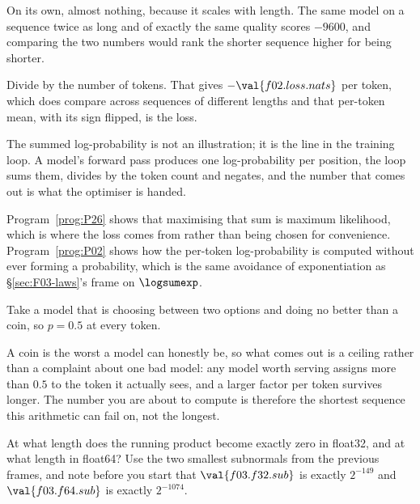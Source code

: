 \begin{fr}
\begin{ansblock}
On its own, almost nothing, because it scales with length. The same model on a
sequence twice as long and of exactly the same quality scores $-9600$, and
comparing the two numbers would rank the shorter sequence higher for being
shorter.

Divide by the number of tokens. That gives $-\val{f02.loss.nats}$ per token,
which does compare across sequences of different lengths \dash{} and that
per-token mean, with its sign flipped, is the loss.
\end{ansblock}

\begin{aibox}
The summed log-probability is not an illustration; it is the line in the
training loop. A model's forward pass produces one log-probability per position,
the loop sums them, divides by the token count and negates, and the number that
comes out is what the optimiser is handed.

Program~\ref{prog:P26} shows that maximising that sum is maximum likelihood,
which is where the loss comes from rather than being chosen for convenience.
Program~\ref{prog:P02} shows how the per-token log-probability is computed
without ever forming a probability, which is the same avoidance of
exponentiation as \S\ref{sec:F03-laws}'s frame on $\logsumexp$.
\end{aibox}
\end{fr}


\begin{fr}
\yourturn
Take a model that is choosing between two options and doing no better than a
coin, so $p = \num{0.5}$ at every token.

A coin is the worst a model can honestly be, so what comes out is a ceiling
rather than a complaint about one bad model: any model worth serving assigns
more than $\num{0.5}$ to the token it actually sees, and a larger factor per
token survives longer. The number you are about to compute is therefore the
shortest sequence this arithmetic can fail on, not the longest.

At what length does the running product become exactly zero in float32, and at
what length in float64? Use the two smallest subnormals from the previous
frames, and note before you start that $\val{f03.f32.sub}$ is exactly
$2^{-149}$ and $\val{f03.f64.sub}$ is exactly $2^{-1074}$.
\dotline
\nextframe
\end{fr}

